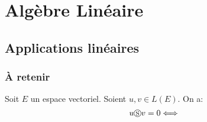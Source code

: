 \section{Algèbre Linéaire}

\subsection{Applications linéaires}

\subsubsection{À retenir}

\begin{prop}
    Soit $E$ un espace vectoriel. Soient  $u, v \in L(E)$.
    On a:
    $$ u \circledS v = 0 \Longleftrightarrow $$
\end{prop}